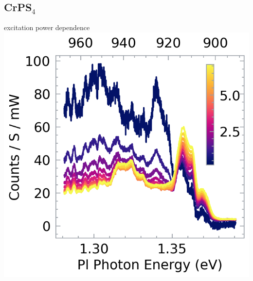 \subsection{CrPS$_4$}
\subsectionframe

\begin{frame}{excitation power dependence}
	\centering
	\includegraphics{../figures/2023-12-14 CrPS4 excitation power dependence.png}
\end{frame}


